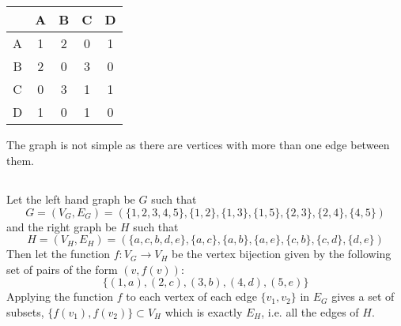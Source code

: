 \documentclass[10pt]{article} %
\begin{document}
\subsection{}
\begin{center}
{\centering
\begin{minipage}[b]{0.4\textwidth}
\centering
\begin{tabular}{c|c c c c} 
    & A & B & C & D\\
    \hline
    A & 1 & 2 & 0 & 1\\
    B & 2 & 0 & 3 & 0\\
    C & 0 & 3 & 1 & 1\\
    D & 1 & 0 & 1 & 0\\
\end{tabular}
\end{minipage}
\hspace{20px}
\centering
\begin{minipage}[c]{0.4\textwidth}
\end{minipage}}
\end{center}
The graph is not simple as there are vertices with more than one edge between them.
\subsection{}
Let the left hand graph be $G$ such that
\[
	G = (V_G,E_G) = (\{1,2,3,4,5\},\{1,2\},\{1,3\},\{1,5\},\{2,3\},\{2,4\},\{4,5\})
\]
and the right graph be $H$ such that 
\[
	H = (V_H,E_H) = (\{a,c,b,d,e\},\{a,c\},\{a,b\},\{a,e\},\{c,b\},\{c,d\},\{d,e\})
\]
Then let the function $f:V_G\to V_H$ be the vertex bijection given by the following set of pairs of the form $(v,f(v))$:
\[
	\{(1,a),(2,c),(3,b),(4,d),(5,e)\}
\]
Applying the function $f$ to each vertex of each edge $\{v_1,v_2\}$ in $E_G$ gives a set of subsets, ${\{f(v_1),f(v_2)\} \subset V_H}$ which is exactly $E_H$, i.e. all the edges of $H$. 
\end{document}
